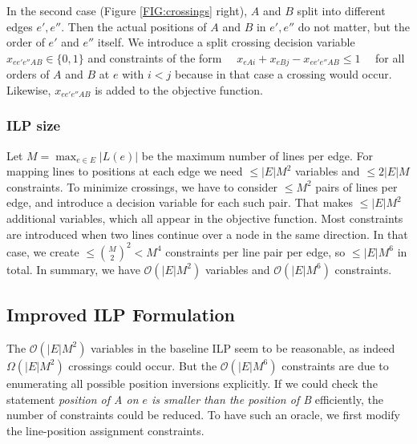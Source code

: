 \documentclass{llncs}
\begin{document}
In the second case (Figure \ref{FIG:crossings} right), $A$ and $B$ split into different edges $e', e''$. Then the actual positions of $A$ and $B$ in $e', e''$ do not matter, but the order of $e'$ and $e''$ itself. We introduce a split crossing decision variable $x_{ee'e''AB} \in \{0,1\}$ and constraints of the form
$\quad x_{eAi} + x_{eBj} - x_{ee'e''AB} \leq 1 \quad$ 
for all orders of $A$ and $B$ at $e$ with $i < j$ because in that case a crossing would occur. Likewise, $x_{ee'e''AB}$ is added to the objective function.

\subsubsection{ILP size}
Let $M = \max_{e \in E} |L(e)|$ be the maximum number of lines per edge. For mapping lines to positions at each edge we need $\leq |E|M^{2}$ variables and $\leq 2|E|M$ constraints. To minimize crossings, we have to consider $\leq M^{2}$ pairs of lines per edge, and introduce a decision variable for each such pair. That makes $\leq |E| M^{2}$ additional variables, which all appear in the objective function. Most constraints are introduced when two lines continue over a node in the same direction. In that case, we create $\leq \binom{M}{2}^{2} < M^{4}$ constraints per line pair per edge, so $\leq |E| M^{6}$ in total.
In summary, we have $\mathcal{O}(|E|M^{2})$ variables and $\mathcal{O}(|E|M^{6})$ constraints.

%
\subsection{Improved ILP Formulation}\label{SEC:improved}
%
The $\mathcal{O}(|E|M^{2})$ variables in the baseline ILP seem to be reasonable, as indeed $\Omega(|E|M^{2})$ crossings could occur. But the $\mathcal{O}(|E|M^{6})$ constraints are due to enumerating all possible position inversions explicitly. If we could check the statement \emph{position of A on $e$ is smaller than the position of B} efficiently, the number of constraints could be reduced. To have such an oracle, we first modify the line-position assignment constraints.
\end{document}

